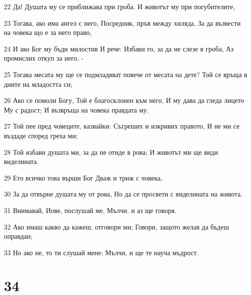 \par 22 Да! Душата му се приближава при гроба. И животът му при погубителите,
\par 23 Тогава, ако има ангел с него, Посредник, пръв между хиляда, За да възвести на човека що е за него право,
\par 24 И ако Бог му бъди милостив И рече: Избави го, за да не слезе в гроба, Аз промислих откуп за него, -
\par 25 Тогава месата му ще се подмладяват повече от месата на дете? Той се връща в дните на младостта си;
\par 26 Ако се помоли Богу, Той е благосклонен към него, И му дава да гледа лицето Му с радост; И възвръща на човека правдата му.
\par 27 Той пее пред човеците, казвайки: Съгреших и изкривих правото, И не ми се въздаде според греха ми;
\par 28 Той избави душата ми, за да не отиде в рова; И животът ми ще види виделината.
\par 29 Ето всичко това върши Бог Дваж и триж с човека,
\par 30 За да отвърне душата му от рова, Но да се просвети с виделината на живота.
\par 31 Внимавай, Иове, послушай ме, Мълчи, и аз ще говоря.
\par 32 Ако имаш какво да кажеш, отговори ми; Говори, защото желая да бъдеш оправдан;
\par 33 Но ако не, то ти слушай мене; Мълчи, и ще те науча мъдрост.

\chapter{34}

